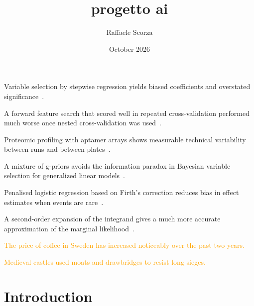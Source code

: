 \documentclass{article}
\title{progetto ai}
\author{Raffaele Scorza}
\date{October 2026}
\newcommand{\needcite}[2][]{\textcolor{orange}{#2}}
\begin{document}
Variable selection by stepwise regression yields biased coefficients and overstated significance~\cite{s40537-018-0143-6}.

A forward feature search that scored well in repeated cross-validation performed much worse once nested cross-validation was used~\cite{file}.

Proteomic profiling with aptamer arrays shows measurable technical variability between runs and between plates~\cite{s41598-022-22116-0}.

A mixture of g-priors avoids the information paradox in Bayesian variable selection for generalized linear models~\cite{liang-etal}.

Penalised logistic regression based on Firth's correction reduces bias in effect estimates when events are rare~\cite{210107620v1}.

A second-order expansion of the integrand gives a much more accurate approximation of the marginal likelihood~\cite{16-EJS1218}.

\needcite{The price of coffee in Sweden has increased noticeably over the past two years.}

\needcite{Medieval castles used moats and drawbridges to resist long sieges.}

\maketitle

\section{Introduction}



\end{document}
